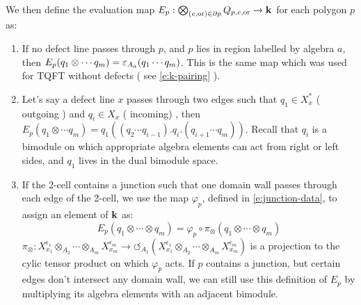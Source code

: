 \begin{defectfiguresetup}
We then define the evaluation map $E_p: \bigotimes_{(e,\mathrm{or}) \in \partial p} Q_{p,e,\mathrm{or}} \rightarrow \mathbf{k} $ for each polygon $p$ as:
\begin{enumerate}
	\item[I.] If no defect line passes through $p$, and $p$ lies in region labelled by algebra $a$, then $E_p(q_1 \otimes \cdots q_m) = \varepsilon_{A_a}(q_1 \cdots q_m)$. This is the same map which was used for TQFT without defects ( see  \eqref{e:k-pairing} ).
	\item[II.] Let's say a defect line $x$  passes through two edges such that $q_1 \in X_x^*$ ( outgoing ) and $q_i \in X_x$ ( incoming) , then $E_p(q_1 \otimes \cdots q_m) = q_1 ( (q_2 \cdots q_{i-1}).q_i.(q_{i+1}\cdots q_m))$. Recall that $q_i$ is a bimodule on which appropriate algebra elements can act from right or left sides, and $q_1$ lives in the dual bimodule space.
	\item[III.] If the 2-cell contains a junction such that one domain wall passes through each edge of the 2-cell, we use the map $\varphi_p$, defined in \eqref{e:junction-data}, to assign an element of $\mathbf{k}$ as:
	\begin{equation}
		E_p(q_1 \otimes \cdots \otimes q_m)=\varphi_p \circ \pi_\otimes(q_1 \otimes \cdots \otimes q_m)
	\end{equation}
	$\pi_\otimes: X_{x_1}^{\epsilon_1} \otimes_{A_2} \cdots \otimes_{A_m}  X_{x_m}^{\epsilon_m} \rightarrow \circlearrowleft_{A_1} (X_{x_1}^{\epsilon_1} \otimes_{A_2} \cdots \otimes_{A_m}  X_{x_m}^{\epsilon_m}) $ is a projection to the cylic tensor product on which $\varphi_p$ acts. If $p$ contains a junction, but certain edges don't intersect any domain wall, we can still use this definition of $E_p$ by multiplying its algebra elements with an adjacent bimodule.
\end{enumerate}


\end{defectfiguresetup}
